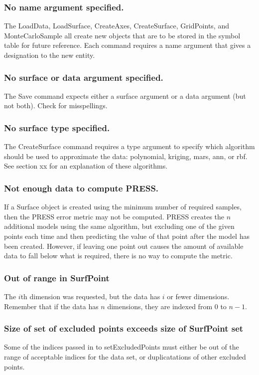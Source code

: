 \documentclass{article}
\begin{document}
\subsubsection{No name argument specified.}
The LoadData, LoadSurface, CreateAxes, CreateSurface, GridPoints, and
MonteCarloSample all create new objects that are to be stored in the symbol
table for future reference.  Each command requires a name argument that gives a
designation to the new entity.

\subsubsection{No surface or data argument specified.}
The Save command expects either a surface argument or a data argument (but not
both).  Check for misspellings.

\subsubsection{No surface type specified.}
The CreateSurface command requires a type argument to specify which algorithm
should be used to approximate the data: polynomial, kriging, mars, ann, or rbf.
See section xx for an explanation of these algorithms.

\subsubsection{Not enough data to compute PRESS.}
If a Surface object is created using the minimum number of required samples,
then the PRESS error metric may not be computed.  PRESS creates the $n$
additional models using the same algorithm, but excluding one of the given
points each time and then predicting the value of that point after the model has
been created.  However, if leaving one point out causes the amount of available
data to fall below what is required, there is no way to compute the metric.

\subsubsection{Out of range in SurfPoint}
The $i$th dimension was requested, but the data has $i$ or fewer dimensions.
Remember that if the data has $n$ dimensions, they are indexed from 0 to $n-1$.

\subsubsection{Size of set of excluded points exceeds size of SurfPoint set}
Some of the indices passed in to setExcludedPoints must either be out of the
range of acceptable indices for the data set, or duplicatations of other
excluded points.
\end{document}
